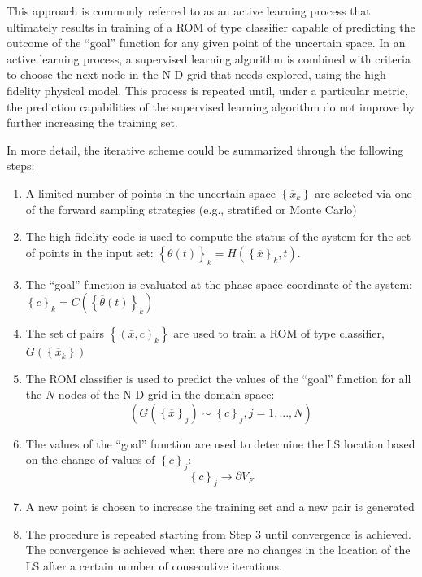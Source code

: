 This approach is commonly referred to as an active learning process
that ultimately results in training of a ROM of type classifier capable of
predicting the outcome of the ``goal'' function for any given point of
the uncertain space.
In an active learning process, a supervised learning algorithm is
combined with criteria to choose the next node in the N D grid that
needs explored, using the high fidelity physical model. This process is
repeated until, under a particular metric, the prediction capabilities of
the supervised learning algorithm do not improve by further increasing
the training set.

In more detail, the iterative scheme could be summarized through the following steps:
\begin{enumerate}
  \item A limited number of points in the uncertain space $\left \{
  \overline{x}_{k} \right \}$ are selected via one of the forward
  sampling strategies (e.g., stratified or Monte Carlo)
  \item The high fidelity code is used to compute the status of the
  system for the set of points in the input set:
  $
  \left \{ \overline{\theta}(t)\right \}_{k} = H\left ( \left \{ \overline{x} \right
  \}_{k},t \right )
  $.
  \item The ``goal'' function is evaluated at the phase space coordinate
  of the system:
  $\left \{ c \right \}_{k} = C\left ( \left \{ \overline{\theta}(t)\right \}_{k}
  \right )$
   \item The set of pairs $\left \{ \left ( \overline{x},c \right )_{k} \right \}$
   are used to train a ROM of type classifier, $G\left ( \left \{
   \overline{x}_{k} \right \} \right )$
   \item The ROM classifier is used to predict the values of the ``goal''
   function for all the $N$ nodes of the N-D grid in the domain space:
   \begin{equation}
   \left (G\left ( \left \{ \overline{x} \right \}_{j} \right ) \sim \left \{ c \right
   \}_{j}, j=1,...,N  \right )
    \end{equation}
    \item The values of the ``goal''  function are used to determine the
    LS location based on the change of values of  $\left \{ c \right
    \}_{j}$:
    \begin{equation}
    \left \{ c \right \}_{j}\rightarrow \partial V_{F}
     \end{equation}
     \item A new point is chosen to increase the training set and a new
     pair is generated
     \item The procedure is repeated starting from Step 3 until
     convergence is achieved. The convergence is achieved when
     there are no changes in the location of the LS after a certain
     number of consecutive iterations.
\end{enumerate}
